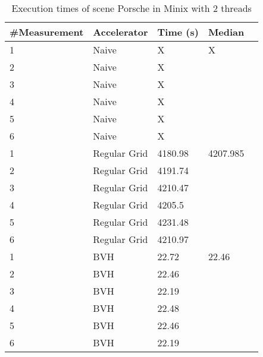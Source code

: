 \begin{table}[H]
	\small
	\begin{tabular}{|l|l|l|l|l|}
		\hline
		\#Measurement & Accelerator & Time (s) & Median \\ \hline
		1 & Naive & X & X \\ \hline
		2 & Naive & X & \\ \hline
		3 & Naive & X & \\ \hline
		4 & Naive & X & \\ \hline
		5 & Naive & X & \\ \hline
		6 & Naive & X & \\ \hline
		1 & Regular Grid & 4180.98 & 4207.985 \\ \hline
		2 & Regular Grid & 4191.74 & \\ \hline
		3 & Regular Grid & 4210.47 & \\ \hline
		4 & Regular Grid & 4205.5 & \\ \hline
		5 & Regular Grid & 4231.48 & \\ \hline
		6 & Regular Grid & 4210.97 & \\ \hline
		1 & BVH & 22.72 & 22.46 \\ \hline
		2 & BVH & 22.46 & \\ \hline
		3 & BVH & 22.19 & \\ \hline
		4 & BVH & 22.48 & \\ \hline
		5 & BVH & 22.46 & \\ \hline
		6 & BVH & 22.19 & \\ \hline
	\end{tabular}
	\label{Time}
	\caption{Execution times of scene Porsche in Minix with 2 threads}
\end{table}

